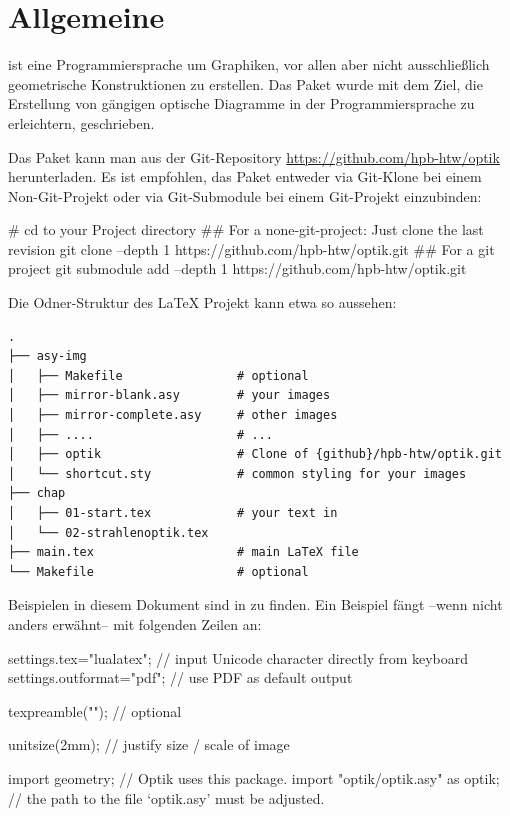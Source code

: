 \chapter{Allgemeine}

\asypmtote\cite{Asymptote} ist eine Programmiersprache um Graphiken, vor allen aber nicht ausschließlich geometrische Konstruktionen zu erstellen.
Das Paket \optik{} wurde mit dem Ziel, die Erstellung von gängigen optische Diagramme in der Programmiersprache \asypmtote{} zu erleichtern, geschrieben.

Das Paket kann man aus der Git-Repository \url{https://github.com/hpb-htw/optik} herunterladen.
Es ist empfohlen, das Paket entweder via Git-Klone bei einem Non-Git-Projekt oder via Git-Submodule bei einem Git-Projekt einzubinden:

\begin{shellcode}
#  cd to your Project directory
## For a none-git-project: Just clone the last revision
git clone --depth 1 https://github.com/hpb-htw/optik.git
## For a git project
git submodule add --depth 1 https://github.com/hpb-htw/optik.git
\end{shellcode}

Die Odner-Struktur des \LaTeX{} Projekt kann etwa so aussehen:

\begin{verbatim}
.
├── asy-img
│   ├── Makefile                # optional
│   ├── mirror-blank.asy        # your images
│   ├── mirror-complete.asy     # other images
│   ├── ....                    # ...
│   ├── optik                   # Clone of {github}/hpb-htw/optik.git
│   └── shortcut.sty            # common styling for your images
├── chap
│   ├── 01-start.tex            # your text in
│   └── 02-strahlenoptik.tex
├── main.tex                    # main LaTeX file
└── Makefile                    # optional
\end{verbatim}


Beispielen in diesem Dokument sind in \repo{} zu finden. 
Ein Beispiel fängt --wenn nicht anders erwähnt-- mit folgenden Zeilen an:

\begin{asycode}
settings.tex="lualatex";  // input Unicode character directly from keyboard
settings.outformat="pdf"; // use PDF as default output

texpreamble(""); // optional

unitsize(2mm);                       // justify size / scale of image

import geometry;                     // Optik uses this package.
import "optik/optik.asy" as optik;   // the path to the file `optik.asy' must be adjusted.
\end{asycode}


